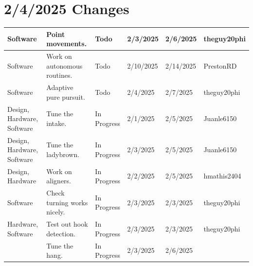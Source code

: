 \section{2/4/2025 Changes}
\begin{center}
\begin{longtable}{| p{40pt} | p{150pt} | p{35pt} | p{33pt} | p{33pt} | p{40pt} |}
\hline \rowcolor{IndianRed1}
Software & Point movements. & Todo & 2/3/2025 & 2/6/2025 & theguy20phi \\
\hline \rowcolor{IndianRed1}
Software & Work on autonomous routines. & Todo & 2/10/2025 & 2/14/2025 & PrestonRD \\
\hline \rowcolor{IndianRed1}
Software & Adaptive pure pursuit. & Todo & 2/4/2025 & 2/7/2025 & theguy20phi \\
\hline \rowcolor{LightGoldenrod1}
Design, Hardware, Software & Tune the intake. & In Progress & 2/1/2025 & 2/5/2025 & Juanle6150 \\
\hline \rowcolor{LightGoldenrod1}
Design, Hardware, Software & Tune the ladybrown. & In Progress & 2/3/2025 & 2/5/2025 & Juanle6150 \\
\hline \rowcolor{LightGoldenrod1}
Design, Hardware & Work on aligners. & In Progress & 2/2/2025 & 2/5/2025 & hmathis2404 \\
\hline \rowcolor{LightGoldenrod1}
Software & Check turning works nicely. & In Progress & 2/3/2025 & 2/3/2025 & theguy20phi \\
\hline \rowcolor{LightGoldenrod1}
Hardware, Software & Test out hook detection. & In Progress & 2/3/2025 & 2/3/2025 & theguy20phi \\
\hline \rowcolor{LightGoldenrod1}
& Tune the hang. & In Progress & 2/3/2025 & 2/6/2025 & \\
\hline
\end{longtable}
\end{center}


